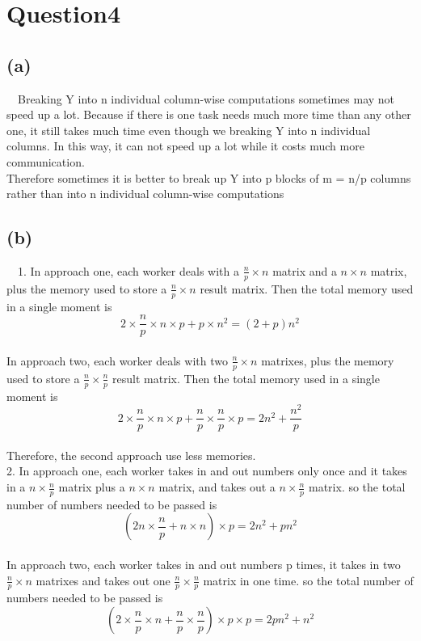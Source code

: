 \documentclass{article}\usepackage[]{graphicx}\usepackage[]{color}
\begin{document}
\section{Question4}
\subsection{(a)}
\quad \ \ Breaking Y into n individual column-wise computations sometimes may not speed up a lot. Because if there is one task needs much more time than any other one, it still takes much time even though we breaking Y into n individual columns. In this way, it can not speed up a lot while it costs much more communication. \\

Therefore sometimes it is better to break up Y into p blocks of m = n/p columns rather than into n individual column-wise computations

\subsection{(b)}
\quad \ \ 1. In approach one, each worker deals with a $\frac{n}{p}\times n$ matrix and a $n\times n$ matrix, plus the memory used to store a $\frac{n}{p}\times n$ result matrix. Then the total memory used in a single moment is 
$$2\times \frac{n}{p}\times n\times p+p\times n^2=(2+p)n^2$$ \\

In approach two, each worker deals with two $\frac{n}{p}\times n$ matrixes, plus the memory used to store a $\frac{n}{p}\times \frac{n}{p}$ result matrix. Then the total memory used in a single moment is 
$$2\times \frac{n}{p}\times n\times p+\frac{n}{p}\times \frac{n}{p}\times p=2n^2+\frac{n^2}{p}$$ \\

Therefore, the second approach use less memories.\\

2. In approach one, each worker takes in and out numbers only once and it takes in a $n\times \frac{n}{p}$ matrix plus a $n\times n$ matrix, and takes out a $n\times \frac{n}{p}$ matrix. so the total number of numbers needed to be passed is 
$$(2n\times \frac{n}{p}+n\times n)\times p=2n^2+pn^2$$ \\

In approach two, each worker takes in and out numbers p times, it takes in two $\frac{n}{p}\times n$ matrixes and takes out one $\frac{n}{p}\times \frac{n}{p}$ matrix in one time. so the total number of numbers needed to be passed is 
$$(2\times \frac{n}{p}\times n+\frac{n}{p}\times \frac{n}{p})\times p \times p=2pn^2+n^2$$ \\
\end{document}
